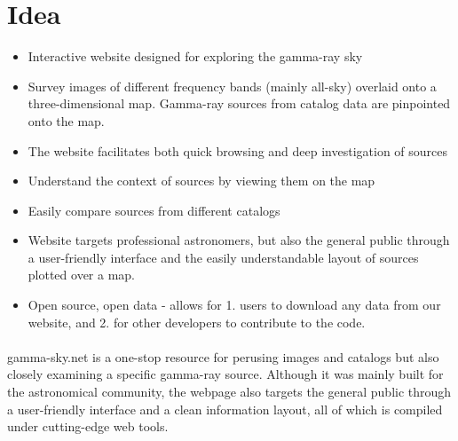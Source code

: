 \section{Idea}

\begin{itemize}

\item Interactive website designed for exploring the gamma-ray sky

\item Survey images of different frequency bands (mainly all-sky) overlaid onto a three-dimensional map. Gamma-ray sources from catalog data are pinpointed onto the map.

\item The website facilitates both quick browsing and deep investigation of sources

\item Understand the context of sources by viewing them on the map

\item Easily compare sources from different catalogs

\item Website targets professional astronomers, but also the general public through
a user-friendly interface and the easily understandable layout of sources plotted over a map.

\item Open source, open data - allows for 1. users to download any data from our website, and 2. for other developers to contribute to the code.

\end{itemize}


\paragraph{}    gamma-sky.net is a one-stop resource for perusing images and catalogs but also closely examining a specific gamma-ray source.
    Although it was mainly built for the astronomical community, the webpage also targets the general public through a
    user-friendly interface and a clean information layout, all of which is compiled under cutting-edge web tools. \par


